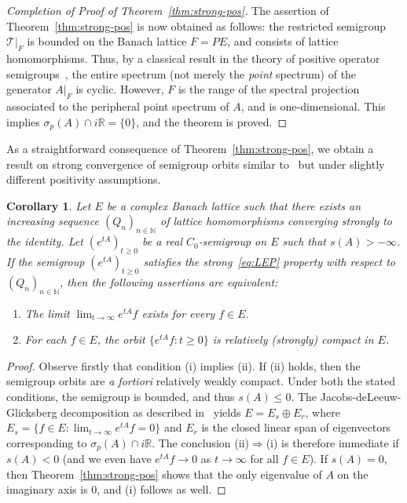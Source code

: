 \documentclass[a4paper, reqno]{amsart}
\numberwithin{equation}{section}
\theoremstyle{plain}
\newtheorem{corollary}[theorem]{Corollary}
\theoremstyle{definition}
\theoremstyle{remark}
\newcommand{\NN}{\mathbb{N}}
\newcommand{\RR}{\mathbb{R}}
\begin{document}
\begin{proof}[Completion of Proof of Theorem~\ref{thm:strong-pos}]
	The assertion of Theorem~\ref{thm:strong-pos} is now obtained as follows: the restricted semigroup $\mathcal{T}|_F$ is bounded on the Banach lattice $F=PE$, and consists of lattice homomorphisms. Thus, by a classical result in the theory of positive operator semigroups~\cite[C-III, Theorem 2.10]{AGG}, the entire spectrum (not merely the \emph{point} spectrum) of the generator $A|_F$ is cyclic. However, $F$ is the range of the spectral projection associated to the peripheral point spectrum of $A$, and is one-dimensional. This implies $\sigma_p(A)\cap i\RR=\{0\}$, and the theorem is proved.
\end{proof}

As a straightforward consequence of Theorem~\ref{thm:strong-pos}, we obtain a result on strong convergence of semigroup orbits similar to~\cite[Corollary 2.2]{ArG21} but under slightly different positivity assumptions.
\begin{corollary}
	Let $E$ be a complex Banach lattice such that there exists an increasing sequence $(Q_n)_{n\in\NN}$ of lattice homomorphisms converging strongly to the identity. Let $(e^{tA})_{t\ge 0}$ be a real $C_0$-semigroup on $E$ such that $s(A)>-\infty$. If the semigroup $(e^{tA})_{t\ge 0}$ satisfies the strong~\eqref{eq:LEP} property with respect to $(Q_n)_{n\in\NN}$, then the following assertions are equivalent:
	\begin{enumerate}[\upshape(i)]
		\item The limit $\lim_{t\to\infty} e^{tA}f$ exists for every $f\in E$.
		\item For each $f\in E$, the orbit $\{e^{tA}f : t \ge 0\}$ is relatively (strongly) compact in $E$.
	\end{enumerate}
\end{corollary}
\begin{proof}
	Observe firstly that condition (i) implies (ii). If (ii) holds, then the semigroup orbits are \emph{a fortiori} relatively weakly compact. Under both the stated conditions, the semigroup is bounded, and thus $s(A)\le0$. The Jacobs-deLeeuw-Glicksberg decomposition as described in~\cite[Theorem V.2.14]{EN00} yields $E=E_s \oplus E_r$, where $E_s = \{f\in E: \lim_{t\to\infty}e^{tA}f = 0\}$ and $E_r$ is the closed linear span of eigenvectors corresponding to $\sigma_p(A)\cap i\RR$. The conclusion (ii)$\Rightarrow$(i) is therefore immediate if $s(A)<0$ (and we even have $e^{tA}f \to 0$ as $t\to\infty$ for all $f\in E$). If $s(A)=0$, then Theorem~\ref{thm:strong-pos} shows that the only eigenvalue of $A$ on the imaginary axis is 0, and (i) follows as well.
\end{proof}
\end{document}
